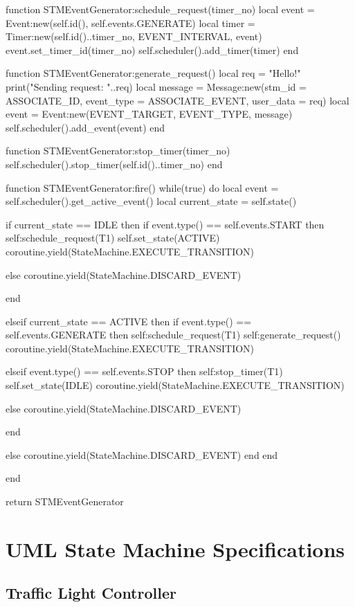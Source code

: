 \begin{appendices}
\begin{listing}[htp]
\begin{luacode}
function STMEventGenerator:schedule_request(timer_no)
	local event = Event:new(self.id(), self.events.GENERATE)
	local timer = Timer:new(self.id()..timer_no, EVENT_INTERVAL, event)
	event.set_timer_id(timer_no)
	self.scheduler().add_timer(timer)
end

function STMEventGenerator:generate_request()
	local req = "Hello!"
	print("Sending request: "..req)
	local message = Message:new({stm_id = ASSOCIATE_ID, event_type = ASSOCIATE_EVENT, user_data = req})
	local event = Event:new(EVENT_TARGET, EVENT_TYPE, message)
	self.scheduler().add_event(event)
end

function STMEventGenerator:stop_timer(timer_no)
	self.scheduler().stop_timer(self.id()..timer_no)
end

function STMEventGenerator:fire()
	while(true) do
		local event = self.scheduler().get_active_event()
		local current_state = self.state()

		if current_state == IDLE then
			if event.type() == self.events.START then
				self:schedule_request(T1)
				self.set_state(ACTIVE)
				coroutine.yield(StateMachine.EXECUTE_TRANSITION)
			
			else
				coroutine.yield(StateMachine.DISCARD_EVENT)
				
			end

		elseif current_state == ACTIVE then
			if event.type() == self.events.GENERATE then
				self:schedule_request(T1)
				self:generate_request()
				coroutine.yield(StateMachine.EXECUTE_TRANSITION)
			
			elseif event.type() == self.events.STOP then
				self:stop_timer(T1)
				self.set_state(IDLE)
				coroutine.yield(StateMachine.EXECUTE_TRANSITION)
			
			else
				coroutine.yield(StateMachine.DISCARD_EVENT)

			end

		else
			coroutine.yield(StateMachine.DISCARD_EVENT)
		end
	end

end

return STMEventGenerator
\end{luacode}
\end{listing}

\FloatBarrier
\chapter{UML State Machine Specifications}
\label{app:stm_uml}

\section{Traffic Light Controller}
\label{uml:traffic_light}


\end{appendices}
